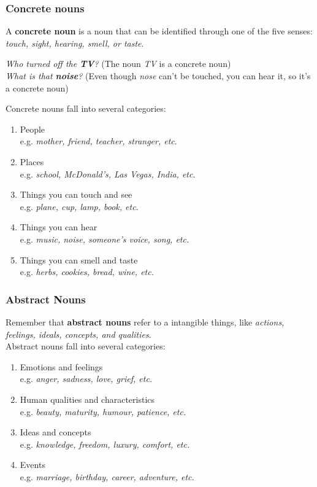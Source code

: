 \documentclass[10pt,a4paper]{article}
\begin{document}
\subsubsection{Concrete nouns}
A \textbf{concrete noun} is a noun that can be identified through one of the five senses: \textit{touch, sight, hearing, smell, or taste}.
\begin{center}
		\textit{Who turned off the \textbf{TV}?} (The noun \textit{TV} is a concrete noun)\\
		\textit{What is that \textbf{noise}?} (Even though \textit{nose} can't be touched, you can hear it, so it's a concrete noun)
\end{center}
Concrete nouns fall into several categories:
\begin{enumerate}[label=\alph*)]
		\item People\\
				e.g. \textit{mother, friend, teacher, stranger, etc}.
		\item Places\\
				e.g. \textit{school, McDonald's, Las Vegas, India, etc}.
		\item Things you can touch and see\\
				e.g. \textit{plane, cup, lamp, book, etc}.
		\item Things you can hear\\
				e.g. \textit{music, noise, someone's voice, song, etc.}
		\item Things you can smell and taste\\
				e.g. \textit{herbs, cookies, bread, wine, etc.}
\end{enumerate}

\subsubsection{Abstract Nouns}
Remember that \textbf{abstract nouns} refer to a intangible things, like \textit{actions, feelings, ideals, concepts, and qualities}.\\
Abstract nouns fall into several categories:
\begin{enumerate}[label=\alph*)]
		\item Emotions and feelings\\
				e.g. \textit{anger, sadness, love, grief, etc.}
		\item Human qualities and characteristics\\
				e.g. \textit{beauty, maturity, humour, patience, etc.}
		\item Ideas and concepts\\
				e.g. \textit{knowledge, freedom, luxury, comfort, etc.}
		\item Events\\
				e.g. \textit{marriage, birthday, career, adventure, etc.}
\end{enumerate}
\end{document}
